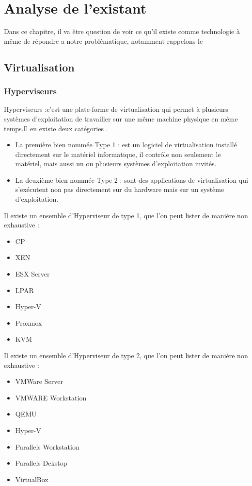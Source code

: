 \chapter{Analyse de l'existant}

Dans ce chapitre, il va être question de voir ce qu'il existe comme technologie à même de répondre a notre problématique, notamment rappelons-le 

\section{Virtualisation}



\subsection{Hyperviseurs}
\begin{mydef}
Hyperviseurs :c'est une plate-forme de virtualisation qui permet à plusieurs systèmes d'exploitation de travailler sur une même machine physique en même temps.Il en existe deux catégories .
	\begin{itemize}
		\item La première bien nommée Type 1 :  est un logiciel de virtualisation installé directement sur le matériel informatique, il contrôle non seulement le matériel, mais aussi un ou plusieurs systèmes d'exploitation invités.
		\item La deuxième bien nommée Type 2 : sont des applications de virtualisation qui s’exécutent non pas directement sur du hardware mais sur un système d’exploitation.
	\end{itemize}
\end{mydef}
Il existe un ensemble d'Hyperviseur de type 1, que l'on peut lister de manière non exhaustive : 

\begin{itemize}
\item CP
\item XEN
\item ESX Server
\item LPAR
\item Hyper-V
\item Proxmox
\item KVM
\end{itemize}

Il existe un ensemble d'Hyperviseur de type 2, que l'on peut lister de manière non exhaustive : 

\begin{itemize}
\item VMWare Server
\item VMWARE Workstation
\item QEMU
\item Hyper-V
\item Parallels Workstation
\item Parallels Dekstop
\item VirtualBox
\end{itemize}

